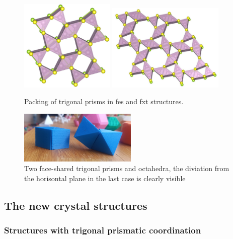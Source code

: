 \documentclass[a4paperm]{article}
\begin{document}
\begin{figure}[H] \centering
	\includegraphics[width=0.4\textwidth]{fes_SMoSe.jpg}
        \includegraphics[width=0.5\textwidth]{fxt_SMoSe.jpg}
	\caption{Packing of trigonal prisms in fes and fxt structures.}
\label{fes_fxt}
\end{figure}

\begin{figure}[H] \centering
	\includegraphics[width=0.5\textwidth]{2prism_oct.jpg}
	\caption{Two face-shared trigonal prisms and octahedra, the diviation from the horisontal plane in the last case is clearly visible}
\label{2prism_oct.jpg}
\end{figure}


		\subsection{The new crystal structures}


\subsubsection{Structures with trigonal prismatic coordination}
\end{document}
